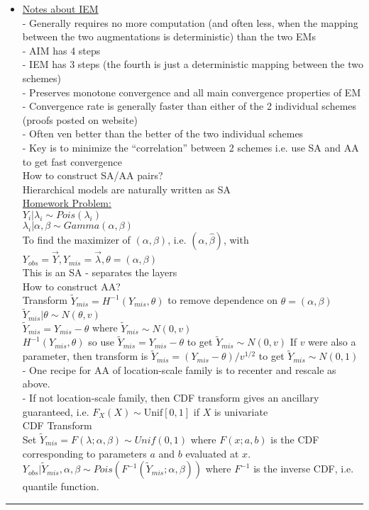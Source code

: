 \documentclass[a4paper, 11pt]{report}
\newcommand{\tab}{\hspace*{1.0em}} %
\newcommand{\yo}{Y_{obs}}
\newcommand{\ym}{Y_{mis}}
\newcommand{\yt}{\widetilde{Y}_{mis}}
\begin{document}
\begin{itemize}
	\item \underline{Notes about IEM} \\
	- Generally requires no more computation (and often less, when the mapping between the two augmentations is deterministic) than the two EMs \\
		\tab - AIM has 4 steps \\
		\tab - IEM has 3 steps (the fourth is just a deterministic mapping between the two schemes)\\
	- Preserves monotone convergence and all main convergence properties of EM \\
	- Convergence rate is generally faster than either of the 2 individual schemes (proofs posted on website) \\
		\tab - Often ven better than the better of the two individual schemes \\
		\tab - Key is to minimize the ``correlation'' between 2 schemes i.e. use SA and AA to get fast convergence \\
		
	How to construct SA/AA pairs? \\
	Hierarchical models are naturally written as SA \\
	\underline{Homework Problem:} \\
	$Y_i | \lambda_i \sim Pois(\lambda_i)$ \\
	$\lambda_i | \alpha, \beta \sim Gamma(\alpha, \beta) $ \\
	To find the maximizer of $(\alpha, \beta)$, i.e. $(\widehat{\alpha}, \widehat{\beta})$, with $\yo = \vec{Y}, \ym = \vec{\lambda}, \theta = (\alpha, \beta) $ \\
	This is an SA - separates the layers \\
	
	How to construct AA? \\
	Transform $\yt = H^{-1}(\ym, \theta)$ to remove dependence on $\theta = (\alpha, \beta) $ \\
	$\yt | \theta \sim N(\theta,v)$ \\
	$\yt = \ym - \theta$ where $\yt \sim N(0,v)$ \\
	$H^{-1}(\ym, \theta)$ so use $\yt = \ym - \theta$ to get $\yt \sim N(0,v)$
	If $v$ were also a parameter, then transform is $\yt = (\ym-\theta)/v^{1/2 }$ to get $\yt \sim N(0,1)$ \\
	
	- One recipe for AA of location-scale family is to recenter and rescale as above.\\
	- If not location-scale family, then CDF transform gives an ancillary guaranteed, i.e. $F_{X}(X) \sim \textrm{Unif}[0,1]$ if $X$ is univariate \\
	
	CDF Transform \\
	Set $\yt = F(\lambda; \alpha, \beta) \sim Unif(0,1)$ where $F(x;a,b)$ is the CDF corresponding to parameters $a$ and $b$ evaluated at $x$.\\
	$\yo | \yt, \alpha, \beta \sim Pois(F^{-1}(\yt;\alpha,\beta))$ where $F^{-1}$ is the inverse CDF, i.e. quantile function.
	
\end{itemize}

\noindent\rule{\textwidth}{1pt} \\
\end{document}
